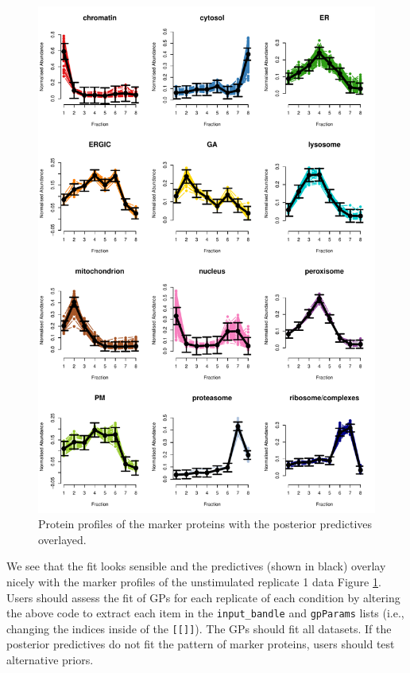 \documentclass[9pt,a4paper,]{extarticle}
\begin{document}
\begin{figure}[H]

{\centering \includegraphics[width=0.9\linewidth,]{figs/gp_plot} 

}

\caption{Protein profiles of the marker proteins with the posterior predictives overlayed.}\label{fig:fig-gps-bandle}
\end{figure}

We see that the fit looks sensible and the predictives (shown in black) overlay
nicely with the marker profiles of the unstimulated replicate 1 data Figure \ref{fig:fig-gps-bandle}.
Users should assess the fit of GPs for each replicate of each condition by altering the above
code to extract each item in the \texttt{input\_bandle} and \texttt{gpParams} lists (i.e., changing
the indices inside of the \texttt{{[}{[}{]}{]}}). The GPs should fit all datasets. If the posterior
predictives do not fit the pattern of marker proteins, users should test alternative
priors.
\end{document}
